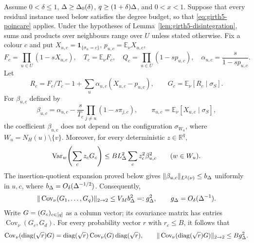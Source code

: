 \begin{lemma}
\label{lem:girth5-color-covariance}
Assume $0<\delta\le1$, $\Delta\ge\Delta_0(\delta)$,
$q\ge(1+\delta)\Delta$, and $0<x<1$.  Suppose that every residual instance
used below satisfies the degree budget, so that \eqref{eq:girth5-poincare}
applies.  Under the hypotheses of
Lemma~\ref{lem:girth5-disintegration}, sums and products over neighbours
range over $U$ unless stated otherwise.  Fix a colour $c$ and put
$X_{u,c}=\mathbf1_{\{\sigma_u=c\}}$,
$p_{u,c}=\mathbb E_\nu X_{u,c}$,
\[
 F_c=\prod_{u\in U}(1-sX_{u,c}),\quad T_c=\mathbb E_\nu F_c,\quad
 Q_c=\prod_{u\in U}(1-sp_{u,c}),\quad
 \alpha_{u,c}=\frac{s}{1-sp_{u,c}}.
\]
Let
\[
 R_c=F_c/T_c-1+\sum_u\alpha_{u,c}(X_{u,c}-p_{u,c}),
 \qquad G_c=\mathbb E_\nu[R_c\mid\sigma_S].
\]
For $\beta_{u,c}$ defined by
\[
 \beta_{u,c}=\alpha_{u,c}-\frac{s}{T_c}
 \prod_{j\ne u}(1-s\pi_{j,c}),
 \qquad
 \pi_{u,c}=\mathbb E_\nu[X_{u,c}\mid\sigma_S],
\]
the coefficient $\beta_{u,c}$ does not depend on the configuration
$\sigma_{W_u}$, where $W_u=N_H(u)\setminus\{v\}$.  Moreover, for every deterministic
$z\in\mathbb R^q$,
\begin{equation}\label{eq:girth5-coordinate-variance}
 \operatorname{Var}_w\!\left(\sum_cz_cG_c\right)
 \le BL_\Delta^2\sum_cz_c^2\beta_{u,c}^2\qquad(w\in W_u).
\end{equation}
The insertion-quotient expansion proved below gives
$\|\beta_{u,c}\|_{L^2(\nu)}\le b_\Delta$ uniformly in $u,c$, where
$b_\Delta=O_\delta(\Delta^{-1/2})$.  Consequently,
\begin{equation}\label{eq:girth5-colour-covariance}
 \|\operatorname{Cov}_\nu(G_1,\ldots,G_q)\|_{2\to2}
 \le V_M b_\Delta^2=:g_\Delta^2,
 \qquad g_\Delta=O_\delta(\Delta^{-1}).
\end{equation}
Write $G=(G_c)_{c\in[q]}$ as a column vector; its covariance matrix
has entries $\operatorname{Cov}_\nu(G_c,G_d)$.  For every probability
vector $r$ with $r_c\le B$, it follows that
\begin{equation}\label{eq:girth5-weighted-covariance}
 \operatorname{Cov}_\nu(\operatorname{diag}(\sqrt r)G)
 =\operatorname{diag}(\sqrt r)\operatorname{Cov}_\nu(G)\operatorname{diag}(\sqrt r),
 \qquad
 \|\operatorname{Cov}_\nu(\operatorname{diag}(\sqrt r)G)\|_{2\to2}
 \le Bg_\Delta^2.
\end{equation}
\end{lemma}


